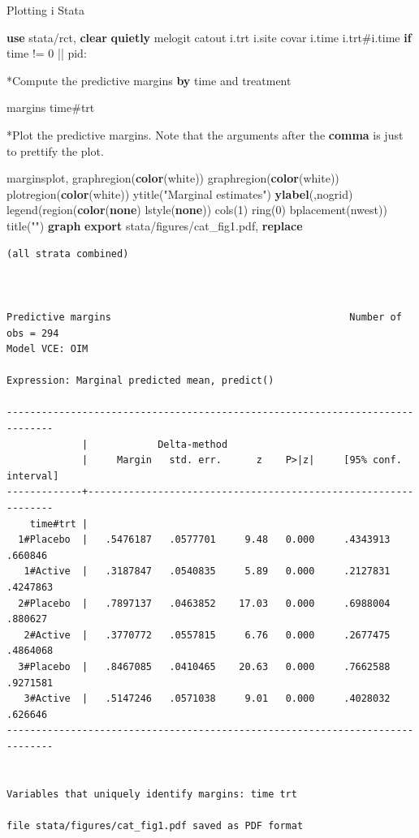 \documentclass[
]{book}
\newenvironment{Shaded}{\begin{snugshade}}{\end{snugshade}}
\newcommand{\BaseNTok}[1]{\textcolor[rgb]{0.00,0.00,0.81}{#1}}
\newcommand{\KeywordTok}[1]{\textcolor[rgb]{0.13,0.29,0.53}{\textbf{#1}}}
\newcommand{\NormalTok}[1]{#1}
\newcommand{\StringTok}[1]{\textcolor[rgb]{0.31,0.60,0.02}{#1}}
\begin{document}
Plotting i Stata

\begin{Shaded}
\begin{Highlighting}[]
\KeywordTok{use}\NormalTok{ stata/rct, }\KeywordTok{clear} 
\KeywordTok{quietly}\NormalTok{ melogit catout i.trt i.site covar i.time i.trt\#i.time }\KeywordTok{if}\NormalTok{ time != 0 || pid: }

\NormalTok{*Compute the predictive margins }\KeywordTok{by}\NormalTok{ time and treatment}

\NormalTok{margins time\#trt}

\NormalTok{*Plot the predictive margins. Note that the arguments after the }\KeywordTok{comma}\NormalTok{ is just to prettify the plot.}

\NormalTok{marginsplot, graphregion(}\KeywordTok{color}\NormalTok{(}\BaseNTok{white}\NormalTok{)) graphregion(}\KeywordTok{color}\NormalTok{(}\BaseNTok{white}\NormalTok{)) }\BaseNTok{plotregion}\NormalTok{(}\KeywordTok{color}\NormalTok{(}\BaseNTok{white}\NormalTok{)) }\BaseNTok{ytitle}\NormalTok{(}\StringTok{"Marginal estimates"}\NormalTok{) }\KeywordTok{ylabel}\NormalTok{(,}\BaseNTok{nogrid}\NormalTok{)  }\BaseNTok{legend}\NormalTok{(region(}\KeywordTok{color}\NormalTok{(}\KeywordTok{none}\NormalTok{) lstyle(}\KeywordTok{none}\NormalTok{)) }\BaseNTok{cols}\NormalTok{(1) }\BaseNTok{ring}\NormalTok{(0) bplacement(nwest)) }\BaseNTok{title}\NormalTok{(}\StringTok{""}\NormalTok{)}
\KeywordTok{graph} \KeywordTok{export}\NormalTok{ stata/figures/cat\_fig1.pdf, }\KeywordTok{replace} 
\end{Highlighting}
\end{Shaded}

\begin{verbatim}
(all strata combined)



Predictive margins                                         Number of obs = 294
Model VCE: OIM

Expression: Marginal predicted mean, predict()

------------------------------------------------------------------------------
             |            Delta-method
             |     Margin   std. err.      z    P>|z|     [95% conf. interval]
-------------+----------------------------------------------------------------
    time#trt |
  1#Placebo  |   .5476187   .0577701     9.48   0.000     .4343913     .660846
   1#Active  |   .3187847   .0540835     5.89   0.000     .2127831    .4247863
  2#Placebo  |   .7897137   .0463852    17.03   0.000     .6988004     .880627
   2#Active  |   .3770772   .0557815     6.76   0.000     .2677475    .4864068
  3#Placebo  |   .8467085   .0410465    20.63   0.000     .7662588    .9271581
   3#Active  |   .5147246   .0571038     9.01   0.000     .4028032     .626646
------------------------------------------------------------------------------


Variables that uniquely identify margins: time trt

file stata/figures/cat_fig1.pdf saved as PDF format
\end{verbatim}
\end{document}
